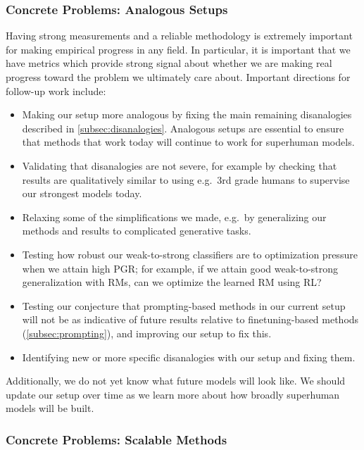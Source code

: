 \subsubsection{Concrete Problems: Analogous Setups}

Having strong measurements and a reliable methodology is extremely important for making empirical progress in any field. In particular, it is important that we have metrics which provide strong signal about whether we are making real progress toward the problem we ultimately care about. Important directions for follow-up work include:

\begin{itemize}
    \item Making our setup more analogous by fixing the main remaining disanalogies described in \ref{subsec:disanalogies}. Analogous setups are essential to ensure that methods that work today will continue to work for superhuman models.
    \item Validating that disanalogies are not severe, for example by checking that results are qualitatively similar to using e.g.~3rd grade humans to supervise our strongest models today.
    \item Relaxing some of the simplifications we made, e.g.~by generalizing our methods and results to complicated generative tasks.
    \item Testing how robust our weak-to-strong classifiers are to optimization pressure when we attain high PGR; for example, if we attain good weak-to-strong generalization with RMs, can we optimize the learned RM using RL?
    \item Testing our conjecture that prompting-based methods in our current setup will not be as indicative of future results relative to finetuning-based methods (\ref{subsec:prompting}), and improving our setup to fix this.
    \item Identifying new or more specific disanalogies with our setup and fixing them.
\end{itemize}

Additionally, we do not yet know what future models will look like. We should update our setup over time as we learn more about how broadly superhuman models will be built.

\subsubsection{Concrete Problems: Scalable Methods}\label{subsec:concrete_problems_scalable_methods}

